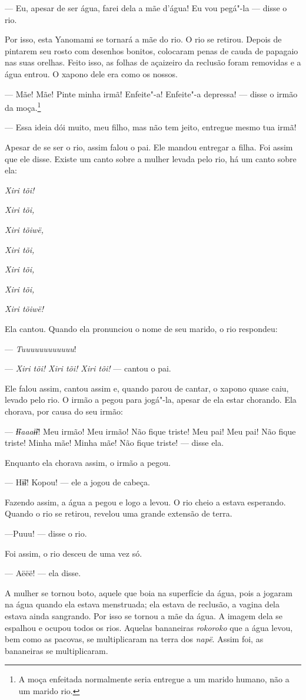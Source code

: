 --- Eu, apesar de ser água, farei dela a mãe d'água! Eu vou pegá"-la ---
disse o rio. 

Por isso, esta Yanomami se tornará a mãe do rio. O rio se retirou.
Depois de pintarem seu rosto com desenhos bonitos, colocaram penas de
cauda de papagaio nas suas orelhas. Feito isso, as folhas de açaizeiro
da reclusão foram removidas e a água entrou. O xapono dele era como os
nossos. 

--- Mãe! Mãe! Pinte minha irmã! Enfeite"-a! Enfeite"-a depressa! --- disse
o irmão da moça.\footnote{   A moça enfeitada normalmente seria entregue a um marido humano, não a um
marido rio.}

--- Essa ideia dói muito, meu filho, mas não tem jeito, entregue mesmo
tua irmã! 

Apesar de se ser o rio, assim falou o pai. Ele mandou entregar a filha.
Foi assim que ele disse. Existe um canto sobre a mulher levada pelo rio,
há um canto sobre ela: 

\emph{Xiri tõi!} 

\emph{Xiri tõi,} 

\emph{Xiri tõiwë,} 

\emph{Xiri tõi,} 

\emph{Xiri tõi,} 

\emph{Xiri tõi,} 

\emph{Xiri tõiwë!} 

Ela cantou. Quando ela pronunciou o nome de seu marido, o rio
respondeu: 

--- \emph{Tuuuuuuuuuuuu}!

--- \emph{Xiri tõi! Xiri tõi! Xiri tõi!} --- cantou o pai. 

Ele falou assim, cantou assim e, quando parou de cantar, o xapono quase
caiu, levado pelo rio. O irmão a pegou para jogá"-la, apesar de ela estar
chorando. Ela chorava, por causa do seu irmão: 

--- \emph{Ɨ̃ɨaaaɨ̃ɨ}! Meu irmão! Meu irmão! Não fique triste! Meu pai! Meu
pai! Não fique triste! Minha mãe! Minha mãe! Não fique triste! --- disse
ela. 

Enquanto ela chorava assim, o irmão a pegou. 

--- Hɨ̃ɨ! Kopou! --- ele a jogou de cabeça. 

Fazendo assim, a água a pegou e logo a levou. O rio cheio a estava
esperando. Quando o rio se retirou, revelou uma grande extensão de
terra. 

---Puuu! --- disse o rio. 

Foi assim, o rio desceu de uma vez só. 

--- Aëëë! --- ela disse. 

A mulher se tornou boto, aquele que boia na superfície da água, pois a
jogaram na água quando ela estava menstruada; ela estava de reclusão, a
vagina dela estava ainda sangrando. Por isso se tornou a mãe da água. A imagem dela se espalhou e ocupou todos os rios. Aquelas
bananeiras \emph{rokoroko} que a água levou, bem como as pacovas, se
multiplicaram na terra dos \emph{napë}. Assim foi, as bananeiras se
multiplicaram. 
